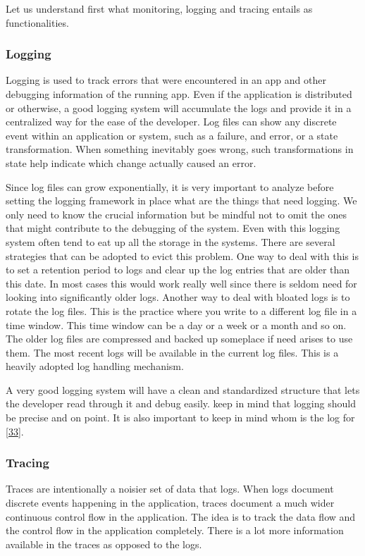 \documentclass[12pt,titlepage]{article}
\begin{document}
Let us understand first what monitoring, logging and tracing entails as functionalities.
\subsubsection{Logging}
\label{sec:orgfe9f48c}
Logging is used to track errors that were encountered in an app and other
debugging information of the running app. Even if the application is distributed
or otherwise, a good logging system will accumulate the logs and provide it in a
centralized way for the ease of the developer. Log files can show any discrete
event within an application or system, such as a failure, and error, or a state
transformation. When something inevitably goes wrong, such transformations in
state help indicate which change actually caused an error.

Since log files can grow exponentially, it is very important to analyze before
setting the logging framework in place what are the things that need logging. We
only need to know the crucial information but be mindful not to omit the ones
that might contribute to the debugging of the system. Even with this logging
system often tend to eat up all the storage in the systems. There are several
strategies that can be adopted to evict this problem. One way to deal with this
is to set a retention period to logs and clear up the log entries that are older
than this date. In most cases this would work really well since there is seldom
need for looking into significantly older logs. Another way to deal with bloated
logs is to rotate the log files. This is the practice where you write to a
different log file in a time window. This time window can be a day or a week or
a month and so on. The older log files are compressed and backed up someplace if
need arises to use them. The most recent logs will be available in the current
log files. This is a heavily adopted log handling mechanism.

A very good logging system will have a clean and standardized structure that
lets the developer read through it and debug easily. keep in mind that logging
should be precise and on point. It is also important to keep in mind whom is the
log for \hyperref[ref:33]{[33}].

\subsubsection{Tracing}
\label{sec:org10a4b24}
Traces are intentionally a noisier set of data that logs. When logs document
discrete events happening in the application, traces document a much wider
continuous control flow in the application. The idea is to track the data flow
and the control flow in the application completely. There is a lot more
information available in the traces as opposed to the logs.
\end{document}
